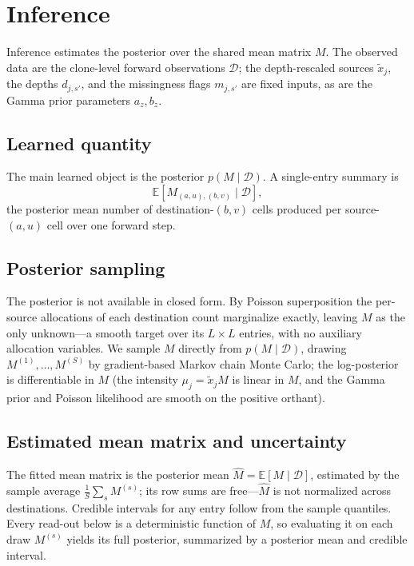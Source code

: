 \documentclass[11pt]{article}
\newcommand{\Dsp}{\mathcal{D}}                    %
\newcommand{\E}{\mathbb{E}}
\theoremstyle{definition}
\begin{document}
\section{Inference}

Inference estimates the posterior over the shared mean matrix $M$. The
observed data are the clone-level forward observations $\Dsp$; the depth-rescaled
sources $\tilde{x}_j$, the depths $d_{j,s'}$, and the missingness flags
$m_{j,s'}$ are fixed inputs, as are the Gamma prior parameters $a_z, b_z$.

\subsection{Learned quantity}

The main learned object is the posterior $p(M \mid \Dsp)$. A single-entry
summary is
\[
  \E\!\left[ M_{(a,u),(b,v)} \mid \Dsp \right],
\]
the posterior mean number of destination-$(b,v)$ cells produced per
source-$(a,u)$ cell over one forward step.

\subsection{Posterior sampling}

The posterior is not available in closed form. By Poisson superposition the
per-source allocations of each destination count marginalize exactly, leaving
$M$ as the only unknown---a smooth target over its $L\times L$ entries, with no
auxiliary allocation variables. We sample $M$ directly from $p(M \mid \Dsp)$,
drawing $M^{(1)},\ldots,M^{(S)}$ by gradient-based Markov chain Monte Carlo; the
log-posterior is differentiable in $M$ (the intensity $\mu_j = \tilde{x}_j M$ is
linear in $M$, and the Gamma prior and Poisson likelihood are smooth on the
positive orthant).

\subsection{Estimated mean matrix and uncertainty}

The fitted mean matrix is the posterior mean $\widehat{M} = \E[M \mid \Dsp]$,
estimated by the sample average $\tfrac{1}{S}\sum_{s} M^{(s)}$; its row sums are
free---$\widehat{M}$ is not normalized across destinations. Credible intervals
for any entry follow from the sample quantiles. Every read-out below is a
deterministic function of $M$, so evaluating it on each draw $M^{(s)}$ yields its
full posterior, summarized by a posterior mean and credible interval.
\end{document}
